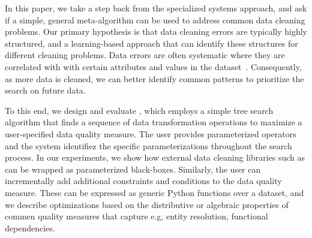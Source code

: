 


In this paper, we take a step back from the specialized systems approach, and ask if a simple, general meta-algorithm can be used to address common data cleaning problems.  Our primary hypothesis is that data cleaning errors are typically highly structured, and a learning-based approach that can identify these structures for different cleaning problems.   
Data errors are often systematic where they are correlated with with certain attributes and values in the dataset~\cite{rekatsinas2017holoclean,DBLP:journals/pvldb/KrishnanWWFG16}.
Consequently, as more data is cleaned, we can better identify common patterns to prioritize the search on future data.




To this end, we design and evaluate \sys, which employs a simple tree search algorithm that finds a sequence of data transformation operations to maximize a user-specified data quality measure.   The user provides parameterized operators and the system identifiez the specific parameterizations throughout the search process.  In our experiments, we show how external data cleaning libraries such as  can be wrapped as parameterized black-boxes.  Similarly, the user can incrementally add additional constraints and conditions to the data quality measure.  These can be expressed as generic Python functions over a dataset, and we describe optimizations based on the distributive or algebraic properties of commen quality measures that capture e.g, entity resolution, functional dependencies.

